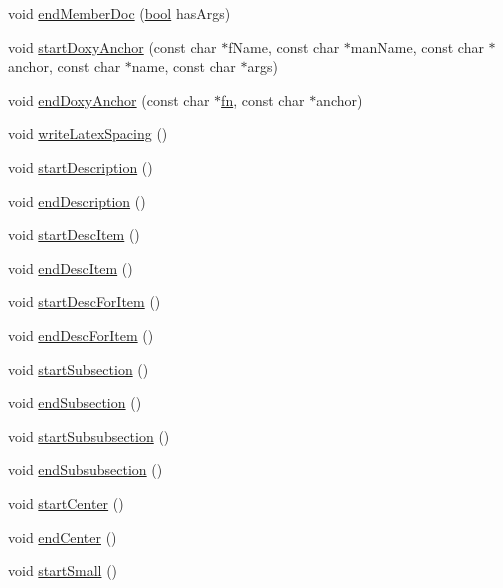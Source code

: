 \begin{DoxyCompactItemize}
void \hyperlink{class_output_list_a1fb2fb5d619d66c8653e05a46a18ef48}{end\+Member\+Doc} (\hyperlink{qglobal_8h_a1062901a7428fdd9c7f180f5e01ea056}{bool} has\+Args)
\item 
void \hyperlink{class_output_list_a7a14e324373ca03a31ec00a0864a9d42}{start\+Doxy\+Anchor} (const char $\ast$f\+Name, const char $\ast$man\+Name, const char $\ast$anchor, const char $\ast$name, const char $\ast$args)
\item 
void \hyperlink{class_output_list_a70b9ce86176b7af95072c01f9027aeb1}{end\+Doxy\+Anchor} (const char $\ast$\hyperlink{tclscanner_8cpp_a9ffad97216456d27984aacce395adf85}{fn}, const char $\ast$anchor)
\item 
void \hyperlink{class_output_list_a2a7a1bca5871c912848bddde9b7dd3fc}{write\+Latex\+Spacing} ()
\item 
void \hyperlink{class_output_list_a63dfb00b7d99d58acfb89473ab8ac7d8}{start\+Description} ()
\item 
void \hyperlink{class_output_list_a231f2150bf8b3d9823cb1f201ecc6774}{end\+Description} ()
\item 
void \hyperlink{class_output_list_a021752b31f2577c15d6cef3e858c84d8}{start\+Desc\+Item} ()
\item 
void \hyperlink{class_output_list_aca7c1dd564ed727ce77f9f2bc43a74ea}{end\+Desc\+Item} ()
\item 
void \hyperlink{class_output_list_a8ac4a6e52094643a093fcdeedf1ae0bc}{start\+Desc\+For\+Item} ()
\item 
void \hyperlink{class_output_list_a5e1d56ddf6a6238a4e1b8733d057c782}{end\+Desc\+For\+Item} ()
\item 
void \hyperlink{class_output_list_ad4ec0814711cb2928d9a32aa69d980d1}{start\+Subsection} ()
\item 
void \hyperlink{class_output_list_a23eb35221592612198b556c577ffe619}{end\+Subsection} ()
\item 
void \hyperlink{class_output_list_af8eba8c14941c51616d949a618516ff4}{start\+Subsubsection} ()
\item 
void \hyperlink{class_output_list_a828e83dee7bf45ee04493942d9dd803b}{end\+Subsubsection} ()
\item 
void \hyperlink{class_output_list_acc709b251fc97e9e5c7d3d205ffb0a5e}{start\+Center} ()
\item 
void \hyperlink{class_output_list_ad71b2d5a74052d9539968a25e7d86bb0}{end\+Center} ()
\item 
void \hyperlink{class_output_list_acf8ce762c6c7838d86ad132f20a2306a}{start\+Small} ()
\item 

\end{DoxyCompactItemize}
